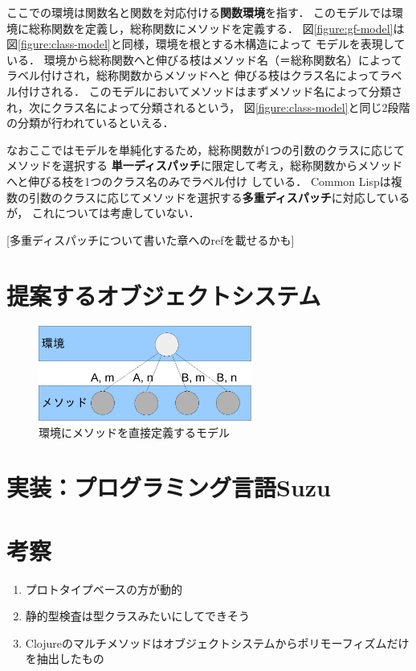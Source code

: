 \documentclass[a4paper,11pt,dvipdfmx]{jreport}
\begin{document}
ここでの環境は関数名と関数を対応付ける\textbf{関数環境}を指す．
このモデルでは環境に総称関数を定義し，総称関数にメソッドを定義する．
図\ref{figure:gf-model}は図\ref{figure:class-model}と同様，環境を根とする木構造によって
モデルを表現している．
環境から総称関数へと伸びる枝はメソッド名（＝総称関数名）によってラベル付けされ，総称関数からメソッドへと
伸びる枝はクラス名によってラベル付けされる．
このモデルにおいてメソッドはまずメソッド名によって分類され，次にクラス名によって分類されるという，
図\ref{figure:class-model}と同じ2段階の分類が行われているといえる．

なおここではモデルを単純化するため，総称関数が1つの引数のクラスに応じてメソッドを選択する
\textbf{単一ディスパッチ}に限定して考え，総称関数からメソッドへと伸びる枝を1つのクラス名のみでラベル付け
している．
Common Lispは複数の引数のクラスに応じてメソッドを選択する\textbf{多重ディスパッチ}に対応しているが，
これについては考慮していない．

[多重ディスパッチについて書いた章へのrefを載せるかも]


\chapter{提案するオブジェクトシステム}

\begin{figure}[htbp]
	\centering
	\includegraphics[width=7cm]{fig/trees_containerless-crop.pdf}
	\caption{環境にメソッドを直接定義するモデル}
	\label{figure:containerlsss-model}
\end{figure}


\chapter{実装：プログラミング言語Suzu}

\chapter{考察}

\begin{enumerate}
\item プロトタイプベースの方が動的
\item 静的型検査は型クラスみたいにしてできそう
\item Clojureのマルチメソッドはオブジェクトシステムからポリモーフィズムだけを抽出したもの
\end{enumerate}
\end{document}
